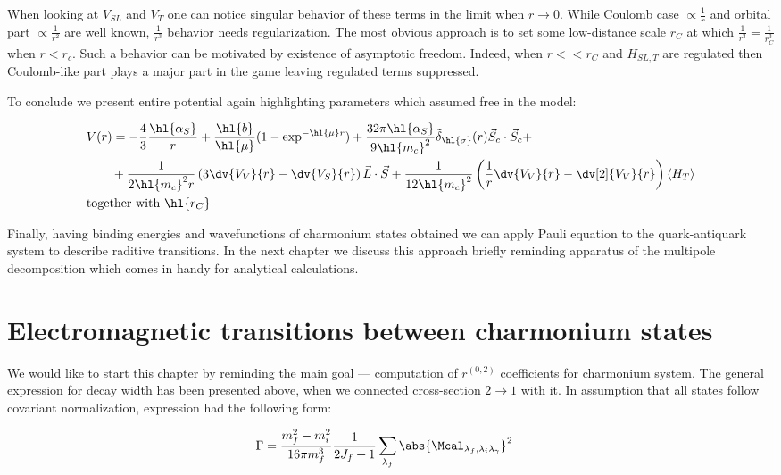 When looking at $V_{SL}$ and $V_T$ one can notice singular behavior of these terms in the limit when $r \rightarrow 0$. While Coulomb case $\propto \frac{1}{r}$ and orbital part $\propto \frac{1}{r^2}$ are well known, $\frac{1}{r^3}$ behavior needs regularization. The most obvious approach is to set some low-distance scale $r_C$ at which $\frac{1}{r^3} = \frac{1}{r_C^3}$ when $r < r_c$. Such a behavior can be motivated by existence of asymptotic freedom. Indeed, when $r << r_C$ and $H_{SL, T}$ are regulated then Coulomb-like part plays a major part in the game leaving regulated terms suppressed.

To conclude we present entire potential again highlighting parameters which assumed free in the model:

\begin{align}
    &V(r) = -\frac{4}{3} \frac{\hl{\alpha_S}}{r} + \frac{\hl{b}}{\hl{\mu}} (1 - \exp^{-\hl{\mu} r}) + \frac{32 \pi \hl{\alpha_S}}{9 \hl{m_c}^2} \tilde{\delta}_{\hl{\sigma}}(r) \vec{S}_c \cdot \vec{S}_{\bar{c}} + \nonumber \\
    &\qquad+ \frac{1}{2 \hl{m_c}^2 r} \left( 3 \dv{V_V}{r} - \dv{V_S}{r} \right) \vec{L} \cdot \vec{S} + \frac{1}{12 \hl{m_c}^2} \left( \frac{1}{r} \dv{V_V}{r} - \dv[2]{V_V}{r} \right) \left<H_T\right> \nonumber \\
    &\text{together with}~\hl{r_C}
\end{align}

Finally, having binding energies and wavefunctions of charmonium states obtained we can apply Pauli equation to the quark-antiquark system to describe raditive transitions. In the next chapter we discuss this approach briefly reminding apparatus of the multipole decomposition which comes in handy for analytical calculations.

\section{Electromagnetic transitions between charmonium states}
We would like to start this chapter by reminding the main goal --- computation of $r^{(0,2)}$ coefficients for charmonium system. The general expression for decay width has been presented above, when we connected cross-section $2 \rightarrow 1$ with it. In assumption that all states follow covariant normalization, expression had the following form:

\begin{align}
    &\Gamma = \frac{m_f^2 - m_i^2}{16 \pi m_f^3} \frac{1}{2J_f + 1} \sum_{\lambda_f} \abs{\Mcal_{\lambda_f, \lambda_i \lambda_\gamma}}^2
\end{align}

